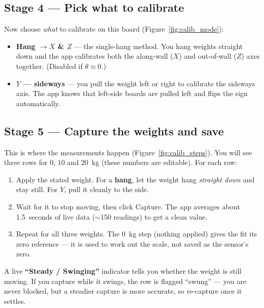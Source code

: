 \documentclass[11pt,a4paper]{article}
\begin{document}

\subsection{Stage 4 --- Pick what to calibrate}
Now choose \emph{what} to calibrate on this board
(Figure~\ref{fig:calib_mode}):
\begin{itemize}[leftmargin=1.4em]
  \item \textbf{Hang $\rightarrow X$ \& $Z$} --- the single-hang method. You hang
        weights straight down and the app calibrates both the along-wall ($X$) and
        out-of-wall ($Z$) axes together. (Disabled if $\theta\approx 0$.)
  \item \textbf{$Y$ --- sideways} --- you pull the weight left or right to
        calibrate the sideways axis. The app knows that left-side boards are pulled
        left and flips the sign automatically.
\end{itemize}


\subsection{Stage 5 --- Capture the weights and save}
This is where the measurements happen (Figure~\ref{fig:calib_steps}). You will see
three rows for $0$, $10$ and $20$~kg (these numbers are editable). For each row:
\begin{enumerate}[leftmargin=1.6em]
  \item Apply the stated weight. For a \textbf{hang}, let the weight hang
        \emph{straight down} and stay still. For \textbf{$Y$}, pull it cleanly to
        the side.
  \item Wait for it to stop moving, then click \textsf{Capture}. The app averages
        about 1.5~seconds of live data ($\sim$150 readings) to get a clean value.
  \item Repeat for all three weights. The $0$~kg step (nothing applied) gives the
        fit its zero reference --- it is used to work out the scale, not saved as
        the sensor's zero.
\end{enumerate}

A live \textbf{``Steady / Swinging''} indicator tells you whether the weight is
still moving. If you capture while it swings, the row is flagged ``swung'' --- you
are never blocked, but a steadier capture is more accurate, so re-capture once it
settles.
\end{document}

